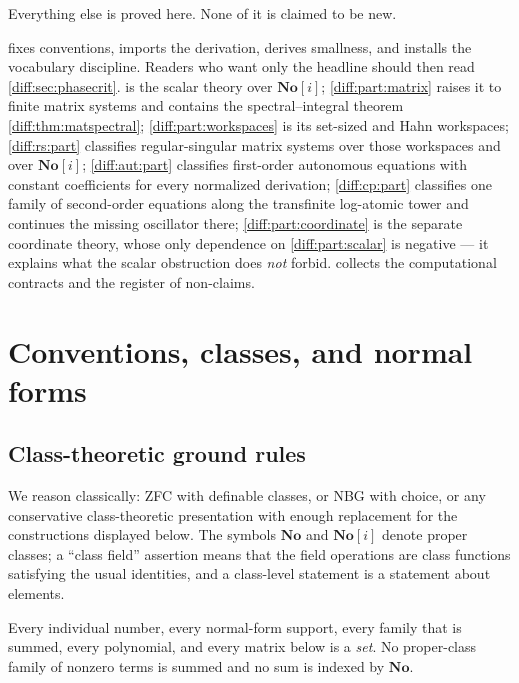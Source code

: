 \documentclass[11pt,letterpaper]{article}
\numberwithin{equation}{section}
\theoremstyle{definition}
\theoremstyle{remark}
\newcommand{\No}{\mathbf{No}}
\newcommand{\SC}{\mathbf{No}[i]}
\begin{document}
Everything else is proved here. None of it is claimed to be new.

\begin{remark}
\label{diff:rem:reading}
 fixes conventions, imports the derivation,
derives smallness, and installs the vocabulary discipline. Readers who want
only the headline should then read \cref{diff:sec:phasecrit}.
 is the scalar theory over $\SC$;
\cref{diff:part:matrix} raises it to finite matrix systems and contains the
spectral--integral theorem \cref{diff:thm:matspectral};
\cref{diff:part:workspaces} is its set-sized and Hahn workspaces;
\cref{diff:rs:part} classifies regular-singular matrix systems over those
workspaces and over $\SC$; \cref{diff:aut:part} classifies first-order
autonomous equations with constant coefficients for every normalized
derivation; \cref{diff:cp:part} classifies one family of second-order
equations along the transfinite log-atomic tower and continues the missing
oscillator there;
\cref{diff:part:coordinate} is the separate coordinate theory, whose only
dependence on \cref{diff:part:scalar} is negative --- it explains what the
scalar obstruction does \emph{not} forbid.  collects the
computational contracts and the register of non-claims.
\end{remark}

\section{Conventions, classes, and normal forms}
\label{diff:sec:conventions}

\subsection{Class-theoretic ground rules}
\label{diff:sub:classes}

We reason classically: ZFC with definable classes, or NBG with choice, or any
conservative class-theoretic presentation with enough replacement for the
constructions displayed below. The symbols $\No$ and $\SC$ denote proper
classes; a ``class field'' assertion means that the field operations are class
functions satisfying the usual identities, and a class-level statement is a
statement about elements.

Every individual number, every normal-form support, every family that is
summed, every polynomial, and every matrix below is a \emph{set}. No
proper-class family of nonzero terms is summed and no sum is indexed by $\No$.
\end{document}
